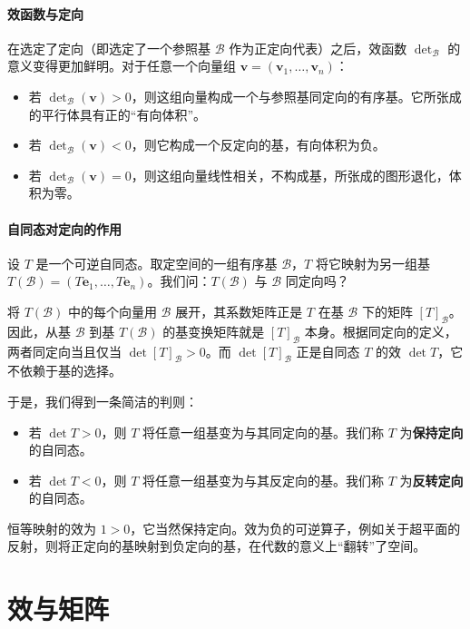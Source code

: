 \documentclass[12pt,UTF8,fontset=none]{ctexbook}
\begin{document}
\paragraph{效函数与定向}
在选定了定向（即选定了一个参照基 $\mathcal{B}$ 作为正定向代表）之后，效函数 $\det_{\mathcal{B}}$ 的意义变得更加鲜明。对于任意一个向量组 $\mathbf{v} = (\mathbf{v}_1, \dots, \mathbf{v}_n)$：
\begin{itemize}
    \item 若 $\det_{\mathcal{B}}(\mathbf{v}) > 0$，则这组向量构成一个与参照基同定向的有序基。它所张成的平行体具有正的“有向体积”。
    \item 若 $\det_{\mathcal{B}}(\mathbf{v}) < 0$，则它构成一个反定向的基，有向体积为负。
    \item 若 $\det_{\mathcal{B}}(\mathbf{v}) = 0$，则这组向量线性相关，不构成基，所张成的图形退化，体积为零。
\end{itemize}

\paragraph{自同态对定向的作用}
设 $T$ 是一个可逆自同态。取定空间的一组有序基 $\mathcal{B}$，$T$ 将它映射为另一组基 $T(\mathcal{B}) = (T\mathbf{e}_1, \dots, T\mathbf{e}_n)$。我们问：$T(\mathcal{B})$ 与 $\mathcal{B}$ 同定向吗？

将 $T(\mathcal{B})$ 中的每个向量用 $\mathcal{B}$ 展开，其系数矩阵正是 $T$ 在基 $\mathcal{B}$ 下的矩阵 $[T]_{\mathcal{B}}$。因此，从基 $\mathcal{B}$ 到基 $T(\mathcal{B})$ 的基变换矩阵就是 $[T]_{\mathcal{B}}$ 本身。根据同定向的定义，两者同定向当且仅当 $\det [T]_{\mathcal{B}} > 0$。而 $\det [T]_{\mathcal{B}}$ 正是自同态 $T$ 的效 $\det T$，它不依赖于基的选择。

于是，我们得到一条简洁的判则：
\begin{itemize}
    \item 若 $\det T > 0$，则 $T$ 将任意一组基变为与其同定向的基。我们称 $T$ 为\textbf{保持定向}的自同态。
    \item 若 $\det T < 0$，则 $T$ 将任意一组基变为与其反定向的基。我们称 $T$ 为\textbf{反转定向}的自同态。
\end{itemize}

恒等映射的效为 $1 > 0$，它当然保持定向。效为负的可逆算子，例如关于超平面的反射，则将正定向的基映射到负定向的基，在代数的意义上“翻转”了空间。

\section{效与矩阵}
\end{document}
